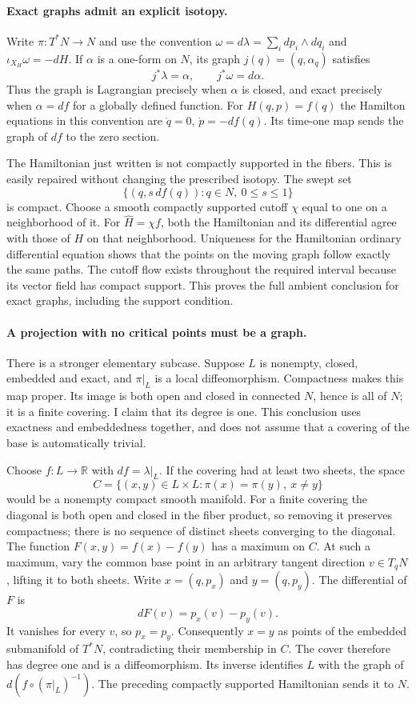 \documentclass[11pt]{article}
\begin{document}
\paragraph{Exact graphs admit an explicit isotopy.}
Write $\pi:T^*N\to N$ and use the convention
$\omega=d\lambda=\sum_i dp_i\wedge dq_i$ and
$\iota_{X_H}\omega=-dH$. If $\alpha$ is a one-form on $N$, its graph
$j(q)=(q,\alpha_q)$ satisfies
\[
 j^*\lambda=\alpha,\qquad j^*\omega=d\alpha.
\]
Thus the graph is Lagrangian precisely when $\alpha$ is closed, and
exact precisely when $\alpha=df$ for a globally defined function.
For $H(q,p)=f(q)$ the Hamilton equations in this convention are
$\dot q=0$, $\dot p=-df(q)$. Its time-one map sends the graph of
$df$ to the zero section.

The Hamiltonian just written is not compactly supported in the fibers.
This is easily repaired without changing the prescribed isotopy. The
swept set
\[
 \{(q,s\,df(q)):q\in N,\ 0\le s\le1\}
\]
is compact. Choose a smooth compactly supported cutoff $\chi$ equal
to one on a neighborhood of it. For $\widehat H=\chi f$, both the
Hamiltonian and its differential agree with those of $H$ on that
neighborhood. Uniqueness for the Hamiltonian ordinary differential
equation shows that the points on the moving graph follow exactly the
same paths. The cutoff flow exists throughout the required interval
because its vector field has compact support. This proves the full
ambient conclusion for exact graphs, including the support condition.

\paragraph{A projection with no critical points must be a graph.}
There is a stronger elementary subcase. Suppose $L$ is nonempty, closed,
embedded and exact, and $\pi|_L$ is a local diffeomorphism. Compactness
makes this map proper. Its image is both open and closed in connected
$N$, hence is all of $N$; it is a finite covering. I claim that its
degree is one. This conclusion uses exactness and embeddedness together,
and does not assume that a covering of the base is automatically trivial.

Choose $f:L\to\mathbb R$ with $df=\lambda|_L$. If the covering had
at least two sheets, the space
\[
 C=\{(x,y)\in L\times L:\pi(x)=\pi(y),\ x\ne y\}
\]
would be a nonempty compact smooth manifold. For a finite covering the
diagonal is both open and closed in the fiber product, so removing it
preserves compactness; there is no sequence of distinct sheets converging
to the diagonal. The function $F(x,y)=f(x)-f(y)$ has a maximum on $C$.
At such a maximum, vary the common base point in an arbitrary tangent
direction $v\in T_qN$, lifting it to both sheets. Write
$x=(q,p_x)$ and $y=(q,p_y)$. The differential of $F$ is
\[
 dF(v)=p_x(v)-p_y(v).
\]
It vanishes for every $v$, so $p_x=p_y$. Consequently $x=y$ as points
of the embedded submanifold of $T^*N$, contradicting their membership
in $C$. The cover therefore has degree one and is a diffeomorphism.
Its inverse identifies $L$ with the graph of $d(f\circ(\pi|_L)^{-1})$.
The preceding compactly supported Hamiltonian sends it to $N$.
\end{document}
